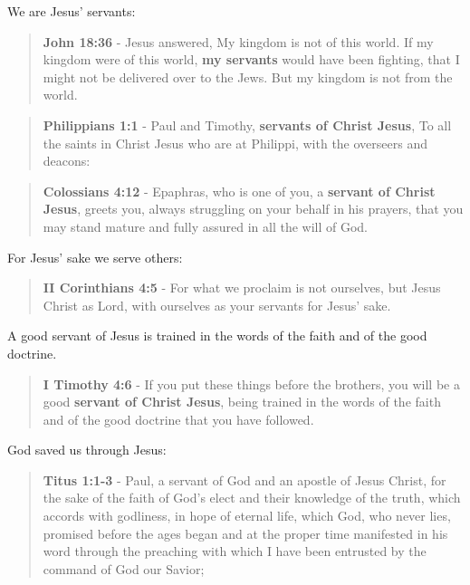 \documentclass[11pt]{article}
\begin{document}
We are Jesus' servants:

\begin{quote}
\textbf{John 18:36} - Jesus answered, My kingdom is not of this world. If my kingdom were of this world, \textbf{my servants} would have been fighting, that I might not be delivered over to the Jews. But my kingdom is not from the world.
\end{quote}

\begin{quote}
\textbf{Philippians 1:1} - Paul and Timothy, \textbf{servants of Christ Jesus}, To all the saints in Christ Jesus who are at Philippi, with the overseers and deacons:
\end{quote}

\begin{quote}
\textbf{Colossians 4:12} - Epaphras, who is one of you, a \textbf{servant of Christ Jesus}, greets you, always struggling on your behalf in his prayers, that you may stand mature and fully assured in all the will of God.
\end{quote}

For Jesus' sake we serve others:

\begin{quote}
\textbf{II Corinthians 4:5} - For what we proclaim is not ourselves, but Jesus Christ as Lord, with ourselves as your servants for Jesus' sake.
\end{quote}

A good servant of Jesus is trained in the words of the faith and of the good doctrine.

\begin{quote}
\textbf{I Timothy 4:6} - If you put these things before the brothers, you will be a good \textbf{servant of Christ Jesus}, being trained in the words of the faith and of the good doctrine that you have followed.
\end{quote}

God saved us through Jesus:

\begin{quote}
\textbf{Titus 1:1-3} - Paul, a servant of God and an apostle of Jesus Christ, for the sake of the faith of God's elect and their knowledge of the truth, which accords with godliness, in hope of eternal life, which God, who never lies, promised before the ages began and at the proper time manifested in his word through the preaching with which I have been entrusted by the command of God our Savior;
\end{quote}
\end{document}
